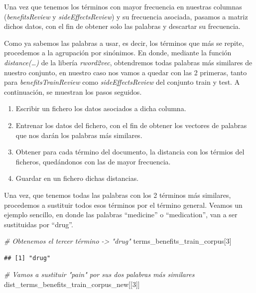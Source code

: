 \documentclass[spanish,]{article}
\newenvironment{Shaded}{\begin{snugshade}}{\end{snugshade}}
\newcommand{\DecValTok}[1]{\textcolor[rgb]{0.00,0.00,0.81}{#1}}
\newcommand{\CommentTok}[1]{\textcolor[rgb]{0.56,0.35,0.01}{\textit{#1}}}
\newcommand{\NormalTok}[1]{#1}
\providecommand{\tightlist}{%
  \setlength{\itemsep}{0pt}\setlength{\parskip}{0pt}}
\begin{document}
Una vez que tenemos los términos con mayor frecuencia en nuestras
columnas (\emph{benefitsReview} y \emph{sideEffectsReview}) y su
frecuencia asociada, pasamos a matriz dichos datos, con el fin de
obtener solo las palabras y descartar su frecuencia.

Como ya sabemos las palabras a usar, es decir, los términos que más se
repite, procedemos a la agrupación por sinónimos. En donde, mediante la
función \emph{distance(\ldots{})} de la libería \emph{rword2vec},
obtendremos todas palabras más similares de nuestro conjunto, en nuestro
caso nos vamos a quedar con las 2 primeras, tanto para
\emph{benefitsTrainReview} como \emph{sideEffectsReview} del conjunto
train y test. A continuación, se muestran los pasos seguidos.

\begin{enumerate}
\def\labelenumi{\arabic{enumi}.}
\tightlist
\item
  Escribir un fichero los datos asociados a dicha columna.
\item
  Entrenar los datos del fichero, con el fin de obtener los vectores de
  palabras que nos darán los palabras más similares.
\item
  Obtener para cada término del documento, la distancia con los térmios
  del ficheros, quedándonos con las de mayor frecuencia.
\item
  Guardar en un fichero dichas distancias.
\end{enumerate}

Una vez, que tenemos todas las palabras con los 2 términos más
similares, procedemos a sustituir todos esos términos por el término
general. Veamos un ejemplo sencillo, en donde las palabras ``medicine''
o ``medication'', van a ser sustituidas por ``drug''.

\begin{Shaded}
\begin{Highlighting}[]
\CommentTok{# Obtenemos el tercer término -> "drug"}
\NormalTok{terms_benefits_train_corpus[}\DecValTok{3}\NormalTok{]}
\end{Highlighting}
\end{Shaded}

\begin{verbatim}
## [1] "drug"
\end{verbatim}

\begin{Shaded}
\begin{Highlighting}[]
\CommentTok{# Vamos a sustituir "pain" por sus dos palabras más similares}
\NormalTok{dist_terms_benefits_train_corpus_new[[}\DecValTok{3}\NormalTok{]]}
\end{Highlighting}
\end{Shaded}
\end{document}
